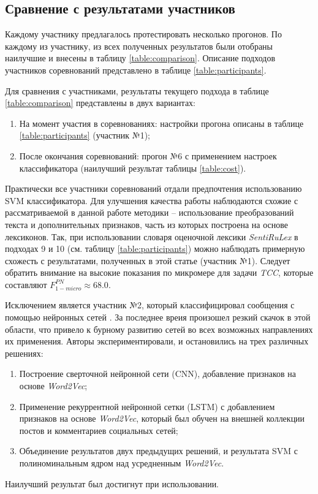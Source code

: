 \subsection{Сравнение с результатами участников}
Каждому участнику предлагалось протестировать несколько прогонов.
По каждому из участнику, из всех полученных результатов были отобраны
наилучшие и внесены в таблицу \ref{table:comparison}.
Описание подходов участников соревнований представлено в таблице
\ref{table:participants}.

Для сравнения с участниками, результаты текущего подхода в таблице
\ref{table:comparison} представлены в двух вариантах:
\begin{enumerate}
    \item На момент участия в соревнованиях: настройки прогона описаны
        в таблице \ref{table:participants} (участник №1);
    \item После окончания соревнований: прогон №6 с применением настроек
        классификатора (наилучший результат таблицы \ref{table:cost}).
\end{enumerate}




Практически все участники соревнований отдали предпочтения использованию
SVM классификатора.
Для улучшения качества работы наблюдаются схожие с рассматриваемой в данной
работе методики -- использование преобразований текста и
дополнительных признаков, часть из которых построена на основе лексиконов.
Так, при использовании словаря оценочной лексики {\it SentiRuLex} в подходах 9 и 10
(см. таблицу \ref{table:participants}) можно наблюдать примерную схожесть с результатами,
полученных в этой статье (участник №1).
Следует обратить внимание на высокие показания по микромере для задачи {\it TCC},
которые составляют  $F_{1-micro}^{PN} \approx 68.0$.

Исключением является участник №2, который классифицировал сообщения с помощью
нейронных сетей \cite{neuralNetworks}.
За последнее вреия произошел резкий скачок в этой области, что привело
к бурному развитию сетей во всех возможных направлениях их применения.
Авторы экспериментировали, и остановились на трех различных решениях:
\begin{enumerate}
    \item Построение сверточной нейронной сети (CNN), добавление признаков на
        основе {\it Word2Vec};
    \item Применение рекуррентной нейронной сетки (LSTM) с добавлением признаков
        на основе {\it Word2Vec}, который был обучен на внешней коллекции
        постов и комментариев социальных сетей;
    \item Объединение результатов двух предыдущих решений, и результата
        SVM с полиноминальным ядром над усредненным {\it Word2Vec}.
\end{enumerate}


Наилучший результат был достигнут при использовании.
